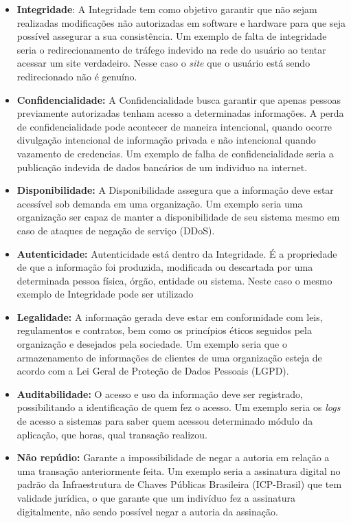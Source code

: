 \begin{itemize}
   \item \textbf{Integridade}: A Integridade tem como objetivo garantir que não sejam realizadas modificações não autorizadas em software e hardware para que seja possível assegurar a sua consistência. Um exemplo de falta de integridade seria o redirecionamento de tráfego indevido na rede do usuário ao tentar acessar um site verdadeiro. Nesse caso o \textit{site} que o usuário está sendo redirecionado não é genuíno.
    
   \item \textbf{Confidencialidade:} A Confidencialidade busca garantir que apenas pessoas previamente autorizadas tenham acesso a determinadas informações. A perda de confidencialidade pode acontecer de maneira intencional, quando ocorre divulgação intencional de informação privada e não intencional quando vazamento de credencias. Um exemplo de falha de confidencialidade seria a publicação indevida de dados bancários de um individuo na internet.
   
        
   \item \textbf{Disponibilidade:} A Disponibilidade assegura que a informação deve estar acessível sob demanda em uma organização. Um exemplo seria uma organização ser capaz de manter a disponibilidade de seu sistema mesmo em caso de ataques de negação de serviço (DDoS). 
        
   \item \textbf{Autenticidade: }Autenticidade está dentro da Integridade. É a propriedade de que a informação foi produzida, modificada ou descartada por uma determinada pessoa física, órgão, entidade ou sistema. Neste caso o mesmo exemplo de Integridade pode ser utilizado
    
   \item \textbf{Legalidade:} A informação gerada deve estar em conformidade com leis, regulamentos e contratos, bem como os princípios éticos seguidos pela organização e desejados pela sociedade. Um exemplo seria que o armazenamento de informações de clientes de uma organização esteja de acordo com a Lei Geral de Proteção de Dados Pessoais (LGPD).
    
   \item \textbf{Auditabilidade:} O acesso e uso da informação deve ser registrado, possibilitando a identificação de quem fez o acesso. Um exemplo seria os \textit{logs} de acesso a sistemas para saber quem acessou determinado módulo da aplicação, que horas, qual transação realizou.
    
   \item\textbf{ Não repúdio:} Garante a impossibilidade de negar a autoria em relação a uma transação anteriormente feita. Um exemplo seria a assinatura digital no padrão da Infraestrutura de Chaves Públicas Brasileira (ICP-Brasil) que tem validade jurídica, o que garante que um indivíduo fez a assinatura digitalmente, não sendo possível negar a autoria da assinação.
    
    
\end{itemize}




